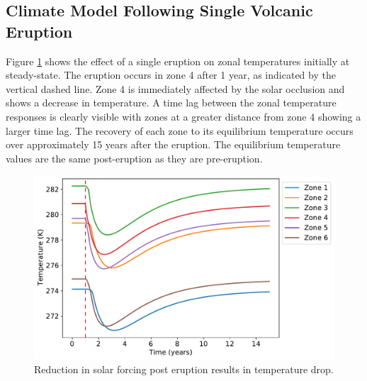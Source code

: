 \documentclass[12pt]{article}
\begin{document}
\subsection{Climate Model Following Single Volcanic Eruption}
Figure \ref{fig:oneerupt} shows the effect of a single eruption on zonal 
temperatures initially at steady-state. The eruption occurs in zone 4 after
1 year, as indicated by the vertical dashed line.
Zone 4 is immediately affected by the solar occlusion and shows a decrease
in temperature. A time lag between the zonal temperature responses is clearly
visible with zones at a greater distance from zone 4 showing a larger time lag.
The recovery of each zone to its equilibrium temperature occurs over approximately
15 years after the eruption. The equilibrium temperature values are the same
post-eruption as they are pre-eruption.

\begin{figure}[H]
    \centering
    \includegraphics[scale=0.6]{one_eruption.pdf}
    \caption{
        Reduction in solar forcing post eruption results in temperature drop.
    }
    \label{fig:oneerupt}
\end{figure}
\FloatBarrier
\end{document}
